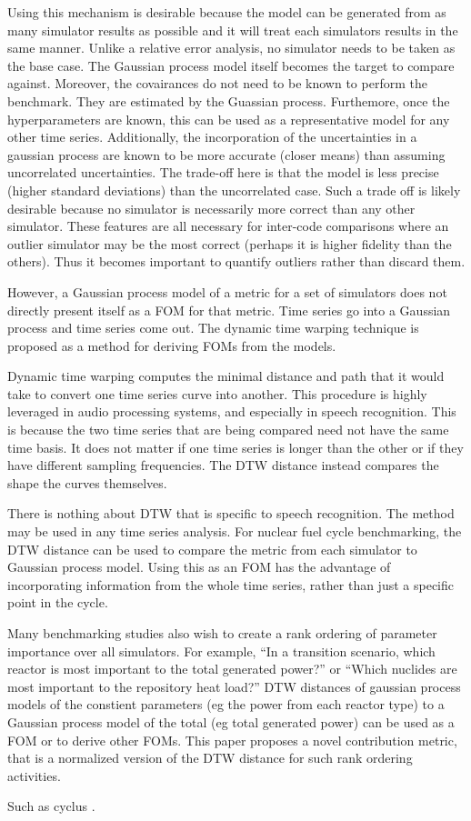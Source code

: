 Using this mechanism is desirable because the model can be generated
from as many simulator results as possible and it will treat each simulators
results in the same manner. Unlike a relative error analysis, no simulator
needs to be taken as the base case. The Gaussian process model itself becomes
the target to compare against. 
Moreover, the covairances do not need to be known to perform the benchmark.
They are estimated by the Guassian process. Furthemore, once the 
hyperparameters are known, this can be used as a representative model for 
any other time series. Additionally, the incorporation of the uncertainties
in a gaussian process are known to be more accurate (closer means) than 
assuming uncorrelated uncertainties.  The trade-off here is that the 
model is less precise (higher standard deviations) than the uncorrelated 
case. Such a trade off is likely desirable because no simulator is 
necessarily more correct than any other simulator. These features are all 
necessary for inter-code comparisons where an outlier simulator may be the 
most correct (perhaps it is higher fidelity than the others). Thus it
becomes important to quantify outliers rather than discard them.

However, a Gaussian process model of a metric for a set of simulators 
does not directly present itself as a FOM for that metric. Time series go 
into a Gaussian process and time series come out. The dynamic time warping 
technique is proposed as a method for deriving FOMs from the models.  

Dynamic time warping computes the minimal distance and path that it would 
take to convert one time series curve into another. This procedure is highly 
leveraged in audio processing systems, and especially in speech recognition.
This is because the two time series that are being compared need not have
the same time basis.  It does not matter if one time series is longer than 
the other or if they have different sampling frequencies. The DTW distance
instead compares the shape the curves themselves. 

There is nothing about DTW that is specific to speech recognition. The method
may be used in any time series analysis. For nuclear fuel cycle benchmarking,
the DTW distance can be used to compare the metric from each simulator to 
Gaussian process model. Using this as an FOM has the advantage of 
incorporating information from the whole time series, rather than just a 
specific point in the cycle.

Many benchmarking studies also wish to create a rank ordering of parameter
importance over all simulators.  For example, ``In a transition scenario,
which reactor is most important to the total generated power?'' or ``Which
nuclides are most important to the repository heat load?'' DTW distances 
of gaussian process models of the constient parameters (eg the power from
each reactor type) to a Gaussian process model of the total (eg total 
generated power) can be used as a FOM or to derive other FOMs. This paper
proposes a novel contribution metric, that is a normalized version of the DTW 
distance for such rank ordering activities.


Such as cyclus \cite{cyclus_v1_2}.